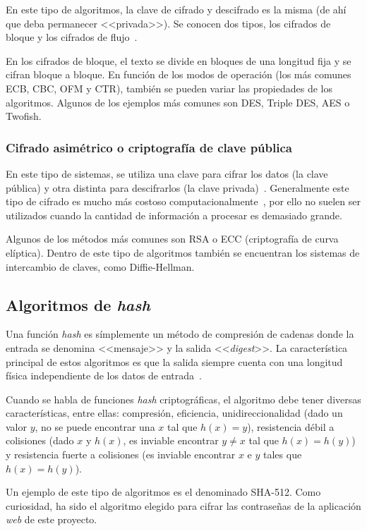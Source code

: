 En este tipo de algoritmos, la clave de cifrado y descifrado es la misma (de ahí que deba permanecer <<privada>>). Se conocen dos tipos, los cifrados de bloque y los cifrados de flujo~\cite{apuntesCybersec}.

En los cifrados de bloque, el texto se divide en bloques de una longitud fija y se cifran bloque a bloque. En función de los modos de operación (los más comunes ECB, CBC, OFM y CTR), también se pueden variar las propiedades de los algoritmos. Algunos de los ejemplos más comunes son DES, Triple DES, AES o Twofish.

\subsubsection{Cifrado asimétrico o criptografía de clave pública}

En este tipo de sistemas, se utiliza una clave para cifrar los datos (la clave pública) y otra distinta para descifrarlos (la clave privada)~\cite{cifradoIBM}. Generalmente este tipo de cifrado es mucho más costoso computacionalmente~\cite{apuntesCybersec}, por ello no suelen ser utilizados cuando la cantidad de información a procesar es demasiado grande. 

Algunos de los métodos más comunes son RSA o ECC (criptografía de curva elíptica). Dentro de este tipo de algoritmos también se encuentran los sistemas de intercambio de claves, como Diffie-Hellman.

\subsection{Algoritmos de \textit{hash}}

Una función \textit{hash} es símplemente un método de compresión de cadenas donde la entrada se denomina <<mensaje>> y la salida <<\textit{digest}>>. La característica principal de estos algoritmos es que la salida siempre cuenta con una longitud física independiente de los datos de entrada~\cite{apuntesCybersec}.

Cuando se habla de funciones \textit{hash} criptográficas, el algoritmo debe tener diversas características, entre ellas: compresión, eficiencia, unidireccionalidad (dado un valor $y$, no se puede encontrar una $x$ tal que $h(x)=y$), resistencia débil a colisiones (dado $x$ y $h(x)$, es inviable encontrar $y \ne x$ tal que $h(x)=h(y)$) y resistencia fuerte a colisiones (es inviable encontrar $x$ e $y$ tales que $h(x)=h(y)$).

Un ejemplo de este tipo de algoritmos es el denominado SHA-512. Como curiosidad, ha sido el algoritmo elegido para cifrar las contraseñas de la aplicación \textit{web} de este proyecto.

